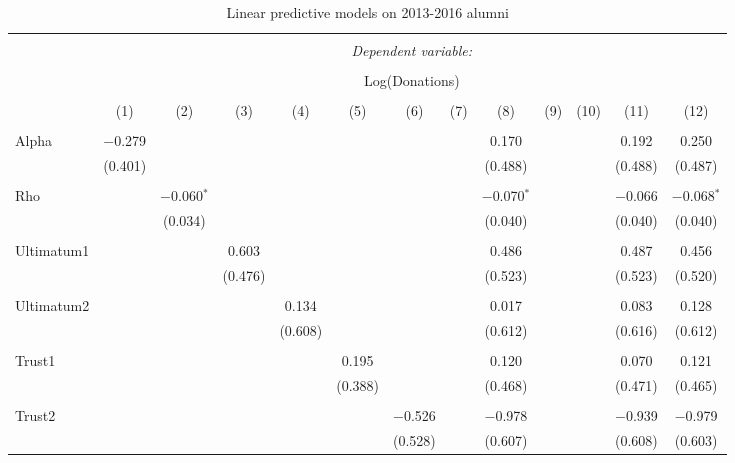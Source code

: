 \newpage

\begin{table}[H] \centering 
  \caption{Linear predictive models on 2013-2016 alumni} 
  \label{} 
  \begin{adjustbox}{width=\textwidth}
  \begin{tabular}{@{\extracolsep{5pt}}lcccccccccccc} 
\\[-1.8ex]\hline 
\hline \\[-1.8ex] 
 & \multicolumn{12}{c}{\textit{Dependent variable:}} \\ 
\cline{2-13} 
\\[-1.8ex] & \multicolumn{12}{c}{Log(Donations)} \\ 
\\[-1.8ex] & (1) & (2) & (3) & (4) & (5) & (6) & (7) & (8) & (9) & (10) & (11) & (12)\\ 
\hline \\[-1.8ex] 
 Alpha & $-$0.279 &  &  &  &  &  &  & 0.170 &  &  & 0.192 & 0.250 \\ 
  & (0.401) &  &  &  &  &  &  & (0.488) &  &  & (0.488) & (0.487) \\ 
  & & & & & & & & & & & & \\ 
 Rho &  & $-$0.060$^{*}$ &  &  &  &  &  & $-$0.070$^{*}$ &  &  & $-$0.066 & $-$0.068$^{*}$ \\ 
  &  & (0.034) &  &  &  &  &  & (0.040) &  &  & (0.040) & (0.040) \\ 
  & & & & & & & & & & & & \\ 
 Ultimatum1 &  &  & 0.603 &  &  &  &  & 0.486 &  &  & 0.487 & 0.456 \\ 
  &  &  & (0.476) &  &  &  &  & (0.523) &  &  & (0.523) & (0.520) \\ 
  & & & & & & & & & & & & \\ 
 Ultimatum2 &  &  &  & 0.134 &  &  &  & 0.017 &  &  & 0.083 & 0.128 \\ 
  &  &  &  & (0.608) &  &  &  & (0.612) &  &  & (0.616) & (0.612) \\ 
  & & & & & & & & & & & & \\ 
 Trust1 &  &  &  &  & 0.195 &  &  & 0.120 &  &  & 0.070 & 0.121 \\ 
  &  &  &  &  & (0.388) &  &  & (0.468) &  &  & (0.471) & (0.465) \\ 
  & & & & & & & & & & & & \\ 
 Trust2 &  &  &  &  &  & $-$0.526 &  & $-$0.978 &  &  & $-$0.939 & $-$0.979 \\ 
  &  &  &  &  &  & (0.528) &  & (0.607) &  &  & (0.608) & (0.603) \\ 

\end{tabular}
\end{adjustbox}
\end{table}
